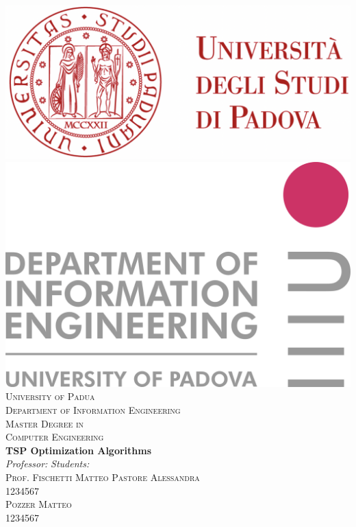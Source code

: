 



\renewcommand{\contentsname}{Index}
\renewcommand{\chaptername}{Chapter}
\renewcommand{\bibname}{References}
\renewcommand{\figurename}{Figure}

\begin{titlepage}
\begin{center}

\includegraphics[scale=0.2]{images/logo_unipd.png} \hfill \includegraphics[scale=0.1]{images/logo_dei.png}\\
\vspace{0.8cm}
\textsc{\LARGE University of Padua}\\
\vspace{0.45cm}
\textsc{\large Department of Information Engineering}\\
\vspace{0.4cm}
\textsc{\large Master Degree in}\\
\textsc{\large Computer Engineering}\\
\vfill
{ \LARGE \bfseries TSP Optimization Algorithms
}\\
\vfill
\textit{\large Professor:} \hfill \textit{\large Students:}\\
\textsc{\large Prof. Fischetti Matteo} \hfill \textsc{Pastore Alessandra}\\
\hfill \textsc{1234567}\\
\hfill \textsc{Pozzer Matteo}\\
\hfill \textsc{1234567}\\


\end{center}
\end{titlepage}
